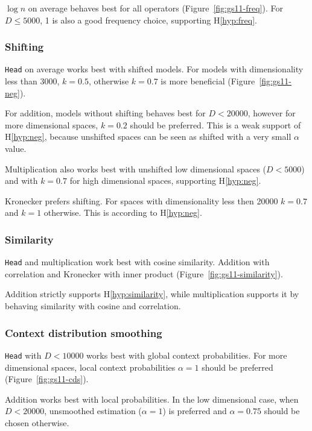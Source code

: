 

$\log n$ on average behaves best for all operators (Figure~\ref{fig:gs11-freq}). For $D \leq 5000$, 1 is also a good frequency choice, supporting H\ref{hyp:freq}.

\subsubsection{Shifting}

\texttt{Head} on average works best with shifted models. For models with dimensionality less than 3000, $k = 0.5$, otherwise $k = 0.7$ is more beneficial (Figure~\ref{fig:gs11-neg}).

For addition, models without shifting behaves best for $D < 20000$, however for more dimensional spaces, $k = 0.2$ should be preferred. This is a weak support of H\ref{hyp:neg}, because unshifted spaces can be seen as shifted with a very small $\alpha$ value.

Multiplication also works best with unshifted low dimensional spaces ($D < 5000$) and with $k = 0.7$ for high dimensional spaces, supporting H\ref{hyp:neg}.

Kronecker prefers shifting. For spaces with dimensionality less then 20000 $k = 0.7$ and $k = 1$ otherwise. This is according to H\ref{hyp:neg}.

\subsubsection{Similarity}



\texttt{Head} and multiplication work best with cosine similarity. Addition with correlation and Kronecker with inner product (Figure~\ref{fig:gs11-similarity}).

Addition strictly supports H\ref{hyp:similarity}, while multiplication supports it by behaving similarity with cosine and correlation.

\subsubsection{Context distribution smoothing}

\texttt{Head} with $D < 10000$ works best with global context probabilities. For more dimensional spaces, local context probabilities $\alpha = 1$ should be preferred (Figure~\ref{fig:gs11-cds}).

Addition works best with local probabilities. In the low dimensional case, when $D < 20000$, unsmoothed estimation ($\alpha = 1$) is preferred and $\alpha = 0.75$ should be chosen otherwise.

